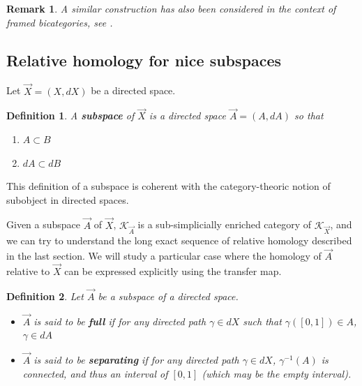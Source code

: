 \documentclass[a4paper,fleqn]{cas-sc}
\newtheorem{rem}{Remark}%
\newtheorem{dfnt}{Definition}%
\newcommand{\K}{\mathcal{K}}
\begin{document}
\begin{rem}
A similar construction has also been considered in the context of framed bicategories, see \cite{augustin2026}.
\end{rem}


\subsection{Relative homology for nice subspaces}
Let $\Vec{X} = (X, dX)$ be a directed space.

\begin{dfnt}
A \textbf{subspace} of $\Vec{X}$ is a directed space $\Vec{A} = (A, dA)$ so that
\begin{enumerate}
    \item $A \subset B$
    \item $dA \subset dB$
\end{enumerate}
\end{dfnt}

This definition of a subspace is coherent with the category-theoric notion of subobject in directed spaces.

Given a subspace $\Vec{A}$ of $\Vec{X}$, $\K_{\Vec{A}}$ is a sub-simplicially enriched category of $\K_{\Vec{X}}$, and we can try to understand the long exact sequence of relative homology described in the last section. We will study a particular case where the homology of $\Vec{A}$ relative to $\Vec{X}$ can be expressed explicitly using the transfer map.

\begin{dfnt}
Let $\Vec{A}$ be a subspace of a directed space.
\begin{itemize}
    \item $\Vec{A}$ is said to be \textbf{full} if for any directed path $\gamma \in dX$ such that $\gamma([0,1]) \in A$, $\gamma \in dA$
    \item $\Vec{A}$ is said to be \textbf{separating} if for any directed path $\gamma \in dX$, $\gamma^{-1} (A)$ is connected, and thus an interval of $[0,1]$ (which may be the empty interval).
\end{itemize}

\end{dfnt}
\end{document}
